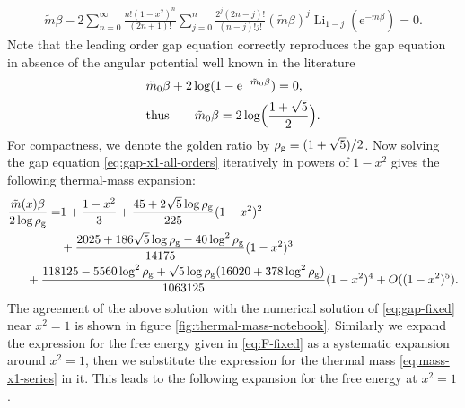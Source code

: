 \documentclass[a4paper,11pt]{article}
\newcommand{\e}{\mathrm e}
\newcommand{\dd}{\mathrm d}
\newcommand{\Li}{\operatorname{Li}}
\begin{document}
\begin{align}
\tilde m\beta
 -2\sum_{n=0}^{\infty}
 \frac{n!(1-x^2)^n}{(2n+1)!}
 \sum_{j=0}^{n}
 \frac{2^j(2n-j)!}{(n-j)!j!}
 (\tilde m\beta)^j\Li_{1-j}(\e^{-\tilde m\beta})=0.
 \label{eq:gap-x1-all-orders}
\end{align}
Note that the leading order gap equation correctly reproduces the gap equation in absence of the angular potential well known in the literature \cite{Sachdev:1993pr,Chubukov:1993aau}
\begin{align}
 &\tilde m_0\beta+2\log(1-\e^{-\tilde m_0\beta})=0,
 \nonumber\\
&{\rm thus}\qquad \tilde m_0\beta
 =2\log\!\Big(\frac{1+\sqrt5}{2}\Big).
 \label{eq:m0-value}
\end{align}
For compactness, we denote the golden ratio by
$\rho_{\rm g}\equiv(1+\sqrt5)/2$.  Now solving the gap equation
\eqref{eq:gap-x1-all-orders} iteratively in powers of $1-x^2$ gives the
following thermal-mass expansion:
\begin{align}
 \frac{\tilde m(x)\beta}{2\log\rho_{\rm g}}
 =&1+\frac{1-x^2}{3}
 +\frac{45+2\sqrt5\log\rho_{\rm g}}{225}(1-x^2)^2
 \nonumber\\
 &+\frac{2025+186\sqrt5\log\rho_{\rm g}-40\log^2\rho_{\rm g}}{14175}
 (1-x^2)^3
 \nonumber\\
 &\hspace{-1 cm}+\frac{118125-5560\log^2\rho_{\rm g}
 +\sqrt5\log\rho_{\rm g}(16020+378\log^2\rho_{\rm g})}{1063125}
(1-x^2)^4
 +O((1-x^2)^5).
 \label{eq:mass-x1-series}
\end{align}
The agreement of the above solution with the numerical solution of \eqref{eq:gap-fixed} near $x^2=1$ is shown in figure \ref{fig:thermal-mass-notebook}.
Similarly we expand the expression for the free energy given in \eqref{eq:F-fixed} as a systematic expansion around  $x^2=1$, then we substitute the expression for the thermal mass \eqref{eq:mass-x1-series} in it. This leads to the following expansion for the free energy at $x^2=1$.
\end{document}
